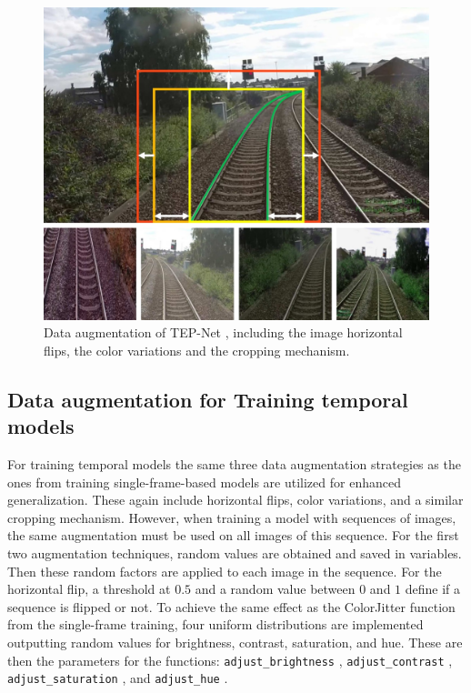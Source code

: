 \begin{figure}[H]
    \centering
    \includegraphics[width=0.6\linewidth]{PICs/Baselinepaper/data_augmenation.jpg}
    \caption{Data augmentation of \ac{TEP}-Net \cite{tepNet2024}, including the image horizontal flips, the color variations and the cropping mechanism.}
    \label{fig:tepNet_dataaugmentation}
\end{figure}

\subsection{Data augmentation for Training temporal models}
\label{sec:dataAugmentationTemporal}

For training temporal models the same three data augmentation strategies as the ones from training single-frame-based models are utilized for enhanced generalization.
These again include horizontal flips, color variations, and a similar cropping mechanism.
However, when training a model with sequences of images, the same augmentation must be used on all images of this sequence.
For the first two augmentation techniques, random values are obtained and saved in variables.
Then these random factors are applied to each image in the sequence.
For the horizontal flip, a threshold at $0.5$ and a random value between $0$ and $1$ define if a sequence is flipped or not.
To achieve the same effect as the ColorJitter \cite{pytorch_colorJitter_docu} function from the single-frame training, four uniform distributions are implemented outputting random values for brightness, contrast, saturation, and hue.
These are then the parameters for the functions: \texttt{adjust\_brightness} \cite{pytorch_adjust_brightness_docu}, \texttt{adjust\_contrast} \cite{pytorch_adjust_contrast_docu}, \texttt{adjust\_saturation} \cite{pytorch_adjust_saturation_docu}, and \texttt{adjust\_hue} \cite{pytorch_adjust_hue_docu}.

